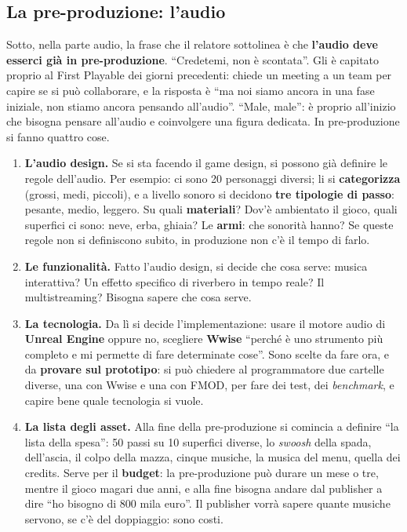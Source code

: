 \subsection{La pre-produzione: l'audio}

Sotto, nella parte audio, la frase che il relatore sottolinea è che
\textbf{l'audio deve esserci già in pre-produzione}. ``Credetemi, non è
scontata''. Gli è capitato proprio al First Playable dei giorni precedenti:
chiede un meeting a un team per capire se si può collaborare, e la risposta è
``ma noi siamo ancora in una fase iniziale, non stiamo ancora pensando
all'audio''. ``Male, male'': è proprio all'inizio che bisogna pensare all'audio e
coinvolgere una figura dedicata. In pre-produzione si fanno quattro cose.

\begin{enumerate}
  \item \textbf{L'audio design.} Se si sta facendo il game design, si possono
        già definire le regole dell'audio. Per esempio: ci sono 20 personaggi
        diversi; li si \textbf{categorizza} (grossi, medi, piccoli), e a livello
        sonoro si decidono \textbf{tre tipologie di passo}: pesante, medio,
        leggero. Su quali \textbf{materiali}? Dov'è ambientato il gioco, quali
        superfici ci sono: neve, erba, ghiaia? Le \textbf{armi}: che sonorità
        hanno? Se queste regole non si definiscono subito, in produzione non c'è
        il tempo di farlo.
  \item \textbf{Le funzionalità.} Fatto l'audio design, si decide che cosa
        serve: musica interattiva? Un effetto specifico di riverbero in tempo
        reale? Il multistreaming? Bisogna sapere che cosa serve.
  \item \textbf{La tecnologia.} Da lì si decide l'implementazione: usare il
        motore audio di \textbf{Unreal Engine} oppure no, scegliere
        \textbf{Wwise} ``perché è uno strumento più completo e mi permette di
        fare determinate cose''. Sono scelte da fare ora, e da \textbf{provare
        sul prototipo}: si può chiedere al programmatore due cartelle diverse,
        una con Wwise e una con FMOD, per fare dei test, dei \emph{benchmark}, e
        capire bene quale tecnologia si vuole.
  \item \textbf{La lista degli asset.} Alla fine della pre-produzione si comincia
        a definire ``la lista della spesa'': 50 passi su 10 superfici diverse, lo
        \emph{swoosh} della spada, dell'ascia, il colpo della mazza, cinque
        musiche, la musica del menu, quella dei credits. Serve per il
        \textbf{budget}: la pre-produzione può durare un mese o tre, mentre il
        gioco magari due anni, e alla fine bisogna andare dal publisher a dire
        ``ho bisogno di 800 mila euro''. Il publisher vorrà sapere quante musiche
        servono, se c'è del doppiaggio: sono costi.
\end{enumerate}

